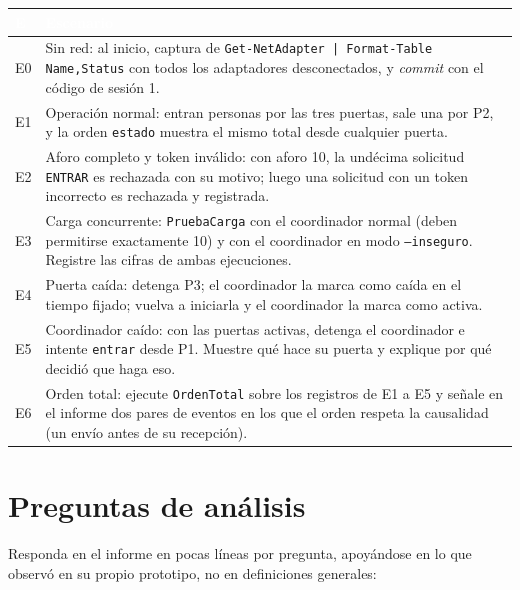 \documentclass[11pt,a4paper]{article}
\newcommand{\hdr}[1]{\textcolor{white}{\textbf{#1}}}
\begin{document}
\begin{xltabular}{\linewidth}{@{}C{0.9cm}Y@{}}
	\toprule
	\hdr{E} & \hdr{Escenario} \\
	\midrule
	\endhead
	E0 & Sin red: al inicio, captura de \texttt{Get-NetAdapter | Format-Table Name,Status} con todos los adaptadores desconectados, y \emph{commit} con el código de sesión 1. \\
	E1 & Operación normal: entran personas por las tres puertas, sale una por P2, y la orden \texttt{estado} muestra el mismo total desde cualquier puerta. \\
	E2 & Aforo completo y token inválido: con aforo 10, la undécima solicitud \texttt{ENTRAR} es rechazada con su motivo; luego una solicitud con un token incorrecto es rechazada y registrada. \\
	E3 & Carga concurrente: \texttt{PruebaCarga} con el coordinador normal (deben permitirse exactamente 10) y con el coordinador en modo \texttt{--inseguro}. Registre las cifras de ambas ejecuciones. \\
	E4 & Puerta caída: detenga P3; el coordinador la marca como caída en el tiempo fijado; vuelva a iniciarla y el coordinador la marca como activa. \\
	E5 & Coordinador caído: con las puertas activas, detenga el coordinador e intente \texttt{entrar} desde P1. Muestre qué hace su puerta y explique por qué decidió que haga eso. \\
	E6 & Orden total: ejecute \texttt{OrdenTotal} sobre los registros de E1 a E5 y señale en el informe dos pares de eventos en los que el orden respeta la causalidad (un envío antes de su recepción). \\
	\bottomrule
\end{xltabular}

\section{Preguntas de análisis}

Responda en el informe en pocas líneas por pregunta, apoyándose en lo que observó en su propio prototipo, no en definiciones generales:
\end{document}
